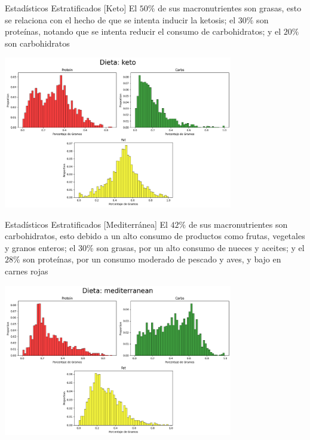 \documentclass{beamer}
\begin{document}
    \begin{frame}{Estadísticos Estratificados [Keto]}
        El $50\%$ de sus macronutrientes son grasas, esto 
        se relaciona con el hecho de que se intenta inducir 
        la ketosis; el $30\%$ son proteínas, notando que se 
        intenta reducir el consumo de carbohidratos; y el 
        $20\%$ son carbohidratos
        \begin{center}
            \includegraphics[width=0.75\textwidth]{Resources/2_03_plot_02.png}
        \end{center}
    \end{frame}

    \begin{frame}{Estadísticos Estratificados [Mediterránea]}
        El $42\%$ de sus macronutrientes son carbohidratos, esto 
        debido a un alto consumo de productos como frutas, vegetales 
        y granos enteros; el $30\%$ son grasas, por un alto consumo de 
        nueces y aceites; y el $28\%$ son proteínas, por un 
        consumo moderado de pescado y aves, y bajo en carnes rojas
        \begin{center}
            \includegraphics[width=0.75\textwidth]{Resources/2_03_plot_03.png}
        \end{center}
    \end{frame}
\end{document}

